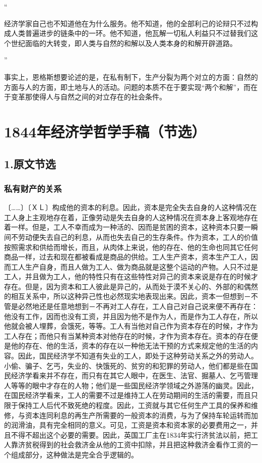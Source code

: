 \documentclass[a4paper,twoside,12pt]{ctexart}
\begin{document}
“\begin{fangsong}
经济学家自己也不知道他在为什么服务。他不知道，他的全部利己的论辩只不过构成人类普遍进步的链条中的一环。他不知道，他瓦解一切私人利益只不过替我们这个世纪面临的大转变，即人类与自然的和解以及人类本身的和解开辟道路。    
\end{fangsong}”

事实上，恩格斯想要论述的是，在私有制下，生产分裂为两个对立的方面：自然的方面与人的方面，即土地与人的活动。问题的本质不在于要实现“两个和解”，而在于变革那使得人与自然之间的对立存在的社会条件。
\newpage
\section{1844年经济学哲学手稿（节选）}
\subsection{1.原文节选}
\subsubsection{私有财产的关系}
〔……〕〔ＸＬ〕构成他的资本的利息。因此，资本是完全失去自身的人这种情况在工人身上主观地存在着，正像劳动是失去自身的人这种情况在资本身上客观地存在着一样。但是，工人不幸而成为一种活的、因而是贫困的资本，这种资本只要一瞬间不劳动便失去自己的利息，从而也失去自己的生存条件。作为资本，工人的价值按照需求和供给而增长，而且，从肉体上来说，他的存在、他的生命也同其它任何商品一样，过去和现在都被看成是商品的供给。工人生产资本，资本生产工人，因而工人生产自身，而且人做为工人、做为商品就是这整个运动的产物。人只不过是工人，并且做为工人，他的特性只有在这些特性对异己的资本来说是存在的时候才存在。但是，因为资本和工人彼此是异己的，从而处于漠不关心的、外部的和偶然的相互关系中，所以这种异己性也必然现实地表现出来。因此，资本一但想到－不管是必然地还是任意地想到－不再对工人存在，工人自己对自己说来便不再存在：他没有工作，因而也没有工资，并且因为他不是作为人，而是作为工人存在，所以他就会被人埋葬，会饿死，等等。工人有当他对自己作为资本存在的时候，才作为工人存在；而他只有当某种资本对他存在的时候，才作为资本存在。资本的存在便是他的存在、他的生活，资本的存在以一种他无法干预的方式来规定他的生活的内容。因此，国民经济学不知道有失业的工人，即处于这种劳动关系之外的劳动人。小偷、骗子、乞丐，失业的、快饿死的、贫穷的和犯罪的劳动人，他们都是些在国民经济学看来并不存在，而只有在其它人眼中，在医生、法官、掘墓人、乞丐管理人等等的眼中才存在的人物；他们是一些国民经济学领域之外游荡的幽灵。因此，在国民经济学看来，工人的需要不过是维持工人在劳动期间的生活的需要，而且只限于保持工人后代不致死绝的程度。因此，工资就与其它任何生产工具的保养和维修，与资本连同利息的再生产所需要的一般资本的消费，与为了保持车轮运转而加的润滑油，具有完全相同的意义。可见，工资是资本和资本家的必要费用之一，并且不得不超出这个必要的需要。因此，英国工厂主在1834年实行济贫法以前，把工人靠济贫税得到的社会救济金从他的工资中扣除，并且把这种救济金看作工资的一个组成部分，这种做法是完全合乎逻辑的。
\end{document}
